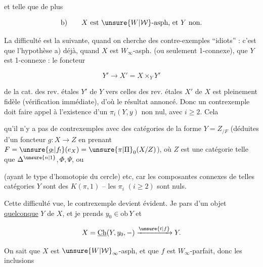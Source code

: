 et telle que de plus

\[
\text{b)}\qquad X\text{ est }\unsure{W|\mathcal W}\text{-asph, et }Y\text{ non.}
\]

\noindent\makebox[0pt][r]{\rule[-4.8\baselineskip]{0.4pt}{5.6\baselineskip}\hspace{.65em}}%
La difficulté est la suivante, quand on cherche des contre-exemples ``idiots'' : c'est que l'hypothèse a)  déjà, quand $X$ est $W_\infty$-asph. (ou seulement 1-connexe), que $Y$ est 1-connexe : le foncteur

\[
Y'\longrightarrow X'=X\times_Y Y'
\]

de la cat. des rev. étales $Y'$ de $Y$ vers celles des rev. étales $X'$ de $X$ est pleinement fidèle (vérification immédiate), d'où le résultat annoncé. Donc un contrexemple doit faire appel à l'existence d'un $\pi_i(Y,y)$ non nul, avec $i\geq2$. Cela 

qu'il n'y a pas de contrexemples avec des catégories  \deleted{\unsure{$\Delta$}} de la forme $Y=Z_{/F}$ \unsure{$\alpha$} (déduites d'un foncteur $g:X\to Z$ en prenant $F=\unsure{g_!|f_!}(e_X)=\unsure{\pi|\Pi}_0(X/Z)$), où $Z$ est une catégorie telle que $\Delta^{\unsure{n|1}}$$, \Phi,\Psi$, ou

\diagram{\begin{tikzcd}[ampersand replacement=\&,row sep=tiny,column sep=tiny]
\& \cdot \&\\
\cdot \arrow[ur] \arrow[dr] \& \& \cdot \arrow[ul] \arrow[dl]\\
\& \cdot \&
\end{tikzcd}}

(ayant le type d'homotopie du cercle) etc, car les composantes connexes de telles catégories $Y$ sont des $K(\pi,1)$ -- les $\pi_i$  $(i\geq 2)$ sont nuls.

Cette difficulté vue, le contrexemple devient évident. Je pars d'un objet  \uline{quelconque} $Y$ de $X$, et je prends $y_0\in\mathrm{ob}\,Y$ et

\[
X=\underline{\mathrm{Ch}}(Y,y_0,-)\xrightarrow{\unsure{t|f}}Y.
\]

 On sait que $X$ est $\unsure{W|\mathcal W}_\infty$-asph, et que $f$ est $W_\infty$-parfait, donc les inclusions

